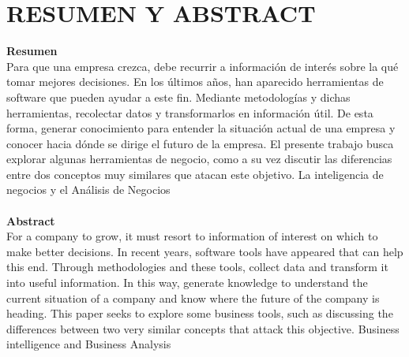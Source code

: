 \section{RESUMEN Y ABSTRACT} 
\begin{flushleft}

\textbf{Resumen}\\
Para que una empresa crezca, debe recurrir a información de interés sobre la qué tomar mejores decisiones. En los últimos años, han aparecido herramientas de software que pueden ayudar a este fin. Mediante metodologías y dichas herramientas, recolectar datos y transformarlos en información útil. De esta forma, generar conocimiento para entender la situación actual de una empresa y conocer hacia dónde se dirige el futuro de la empresa.
El presente trabajo busca explorar algunas herramientas de negocio, como a su vez discutir las diferencias entre dos conceptos muy similares que atacan este objetivo. La inteligencia de negocios y el Análisis de Negocios
\textbf{}\\
\textbf{}\\

\textbf{Abstract}\\
For a company to grow, it must resort to information of interest on which to make better decisions. In recent years, software tools have appeared that can help this end. Through methodologies and these tools, collect data and transform it into useful information. In this way, generate knowledge to understand the current situation of a company and know where the future of the company is heading.
This paper seeks to explore some business tools, such as discussing the differences between two very similar concepts that attack this objective. Business intelligence and Business Analysis












\end{flushleft}
